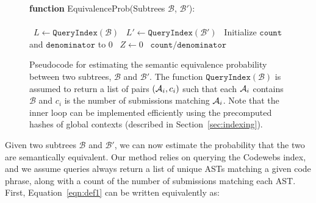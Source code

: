 \begin{figure}
\begin{center}
\begin{algorithm2e}[H]
{\bf function} {\sc EquivalenceProb}\xspace(Subtrees $\mathcal{B}$, $\mathcal{B}'$): \\ 
\mbox{}\\
\ $L \leftarrow \texttt{QueryIndex}(\mathcal{B})$ \;
\ $L' \leftarrow \texttt{QueryIndex}(\mathcal{B'})$ \;
\ Initialize $\texttt{count}$ and $\texttt{denominator}$ to 0\;
\ $Z \leftarrow 0$\;
\ForEach{AST $\AST_i \in L$}{ 
	\If{$\AST_i\backslash \mathcal{B} = \AST_i'\backslash \mathcal{B}'$ for some $\AST_i'\in L'$}{
\	$w_i \leftarrow c_i*c_i'$ \;
\	$\texttt{count} \leftarrow \texttt{count} + w_i$ if $F[\AST_i]=F[\AST_i']$ \;
\	$\texttt{denominator} \leftarrow \texttt{denominator} + w $ \;
	}
}
\ \Return $\texttt{count}/\texttt{denominator}$ \;
\caption{Pseudocode for estimating the semantic equivalence probability between two subtrees, $\mathcal{B}$ and $\mathcal{B}'$.  
The function $\texttt{QueryIndex}(\mathcal{B})$ is assumed to return a list of pairs $(\mathcal{A}_i,c_i)$ such that each $\mathcal{A}_i$ contains $\mathcal{B}$
and $c_i$ is the number of submissions matching $\mathcal{A}_i$.   Note that the inner loop can be implemented efficiently using 
the precomputed hashes of global contexts (described in Section~\ref{sec:indexing}).
}
\label{alg:estimate}
\end{algorithm2e}
\end{center}
\end{figure}

\mbox{}
Given two subtrees $\mathcal{B}$ and $\mathcal{B}'$, we can now estimate the probability
that the two are semantically equivalent.   Our method relies on querying the Codewebs index, and 
we assume queries always return a list of unique ASTs matching a given code phrase, along with a count of the number of submissions 
matching each AST.
First, Equation~\ref{eqn:def1} can be written equivalently as:

